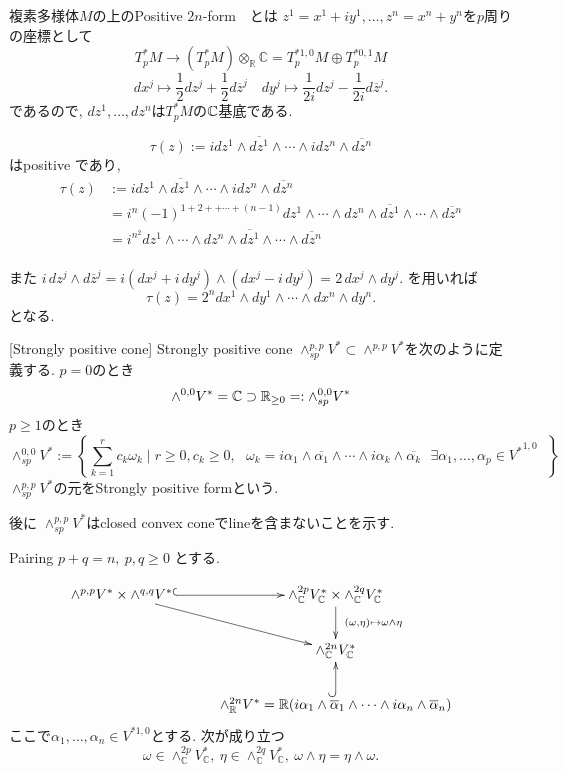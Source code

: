 複素多様体$M$の上のPositive $2n$-form　とは
$z^1=x^1+ iy^1, \ldots, z^n=x^n + y^n$を$p$周りの座標として
\[
T_p^*M
\longrightarrow
(T_p^*M)\otimes_{\mathbb{R}}\mathbb{C}
=
T_p^{*1,0}M\oplus T_p^{*0,1}M
\]
\[
dx^j
\longmapsto
\frac{1}{2}dz^j+\frac{1}{2}d\overline{z}^j
\quad
dy^j
\longmapsto
\frac{1}{2i}dz^j-\frac{1}{2i}d\overline{z}^j.
\]
であるので, $dz^1, \ldots, dz^n$は$T_p^*M$の$\mathbb{C}$基底である.

$$
\tau(z):=i dz^1 \wedge \overline{dz^1} \wedge \cdots \wedge i dz^n\wedge \overline{dz^n} 
$$
はpositive であり, 
\begin{align*}
\tau(z)
&:=i dz^1 \wedge \overline{dz^1} \wedge \cdots \wedge i dz^n\wedge \overline{dz^n}
\\
&=i^n (-1)^{1 + 2 + + \cdots + (n-1)}
dz^1 \wedge \cdots \wedge dz^n\wedge   \overline{dz^1} \wedge \cdots \wedge \overline{dz^n}
\\
&=i^{n^2}dz^1 \wedge \cdots \wedge dz^n  \wedge \overline{dz^1} \wedge \cdots \wedge \overline{dz^n}
\\
\end{align*}


また
\(
i\,dz^j\wedge d\overline{z}^j
=
i(dx^j+i\,dy^j)\wedge(dx^j-i\,dy^j)
=
2\,dx^j\wedge dy^j.
\)
を用いれば
\[
\tau(z)
=
2^n dx^1\wedge dy^1\wedge\cdots\wedge dx^n\wedge dy^n.
\]
となる. 



\begin{tcolorbox}[mybox]
\begin{defn}
\label{defn-M-4.4.4}[Strongly positive cone]
Strongly positive cone $\wedge_{sp}^{p,p}V^{*} \subset 
\wedge^{p,p}V^{*}$を次のように定義する.
$p=0$のとき
$$
\wedge^{0,0}V^{*}=\mathbb{C} \supset \mathbb{R}_{\ge 0}=:\wedge_{sp}^{0,0}V^{*}
$$
$p \ge 1$のとき
$$
\wedge_{sp}^{0,0}V^{*}
:= \left\{ \sum_{k=1}^{r} c_k \omega_k \mid \text{$r \ge 0, c_k \ge 0,$ }
\omega_k= i \alpha_1 \wedge \overline{\alpha_1} \wedge \cdots \wedge i \alpha_k\wedge \overline{\alpha_k} \text{ $\exists \alpha_1, \ldots, \alpha_p \in {V^{*}}^{1,0} $ }
\right\}
$$
 $\wedge_{sp}^{p,p}V^{*}$の元をStrongly positive formという. 
\end{defn}
\end{tcolorbox}
後に $\wedge_{sp}^{p,p}V^{*}$はclosed convex coneでlineを含まないことを示す. 


Pairing \(p+q=n,\ p,q\ge 0\) とする.

\[
\xymatrix@C=28pt@R=22pt{
\wedge^{p,p}V^* \times \wedge^{q,q}V^*
  \ar@{^{(}->}[r]
  \ar[dr]
&
\wedge_{\mathbb C}^{2p}V_{\mathbb C}^* \times \wedge_{\mathbb C}^{2q}V_{\mathbb C}^*
  \ar[d]^-{\ (\omega,\eta)\mapsto \omega\wedge\eta\ }
\\
&
\wedge_{\mathbb C}^{2n}V_{\mathbb C}^*
  \\ 
  & 
  \wedge_{\mathbb R}^{2n}V^*
  =
  \mathbb R\!\left(
    i\alpha_1\wedge\overline{\alpha}_1\wedge\cdots\wedge i\alpha_n\wedge\overline{\alpha}_n
  \right)
    \ar@{^{(}->}[u]
}
\]
ここで$\alpha_1,\ldots,\alpha_n\in V^{*1,0}$とする. 
次が成り立つ
\[\omega\in \wedge_{\mathbb{C}}^{2p}V_{\mathbb{C}}^*,\ \eta\in \wedge_{\mathbb{C}}^{2q}V_{\mathbb{C}}^*,\ \omega\wedge\eta=\eta\wedge\omega.\]


